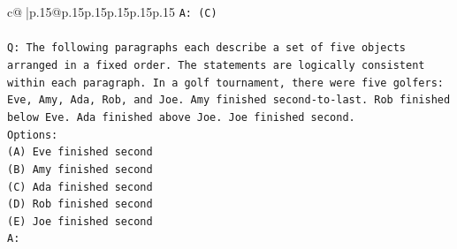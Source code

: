 \documentclass{article}
\begin{document}
{\begin{supertabular}{c@{$\;$}|p{.15\linewidth}@{}p{.15\linewidth}p{.15\linewidth}p{.15\linewidth}p{.15\linewidth}p{.15\linewidth}}
{{{\texttt{A: (C)} \\
\\ 
\texttt{Q: The following paragraphs each describe a set of five objects arranged in a fixed order. The statements are logically consistent within each paragraph. In a golf tournament, there were five golfers: Eve, Amy, Ada, Rob, and Joe. Amy finished second{-}to{-}last. Rob finished below Eve. Ada finished above Joe. Joe finished second.} \\
\texttt{Options:} \\
\texttt{(A) Eve finished second} \\
\texttt{(B) Amy finished second} \\
\texttt{(C) Ada finished second} \\
\texttt{(D) Rob finished second} \\
\texttt{(E) Joe finished second} \\
\texttt{A:} \\
            }
        }
    }
     \\ \\


\end{supertabular}}
\end{document}

